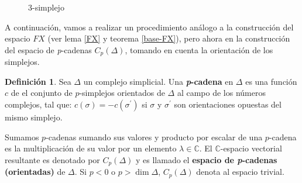 \documentclass[12pt]{book}
\theoremstyle{definition}
\newtheorem{definition}[theorem]{Definición}
\newcounter{in}
\newcounter{ini}
\begin{document}
\begin{figure}[h]
  \centering
  
  \caption{3-simplejo}
  \label{fig:3-simplejo}
\end{figure}
A continuación, vamos a realizar un procedimiento análogo a la construcción del
espacio $FX$ (ver lema \ref{FX} y teorema \ref{base-FX}), pero ahora en la
construcción del espacio de \emph{p}-cadenas $C_{p}(\Delta)$, tomando
en cuenta la orientación de los simplejos.
\begin{definition}
  Sea $\Delta$ un complejo simplicial. Una \textbf{\emph{p}-cadena} en
  $\Delta$ es una función $c$ de el conjunto de $p$-simplejos
  orientados de
  $\Delta$ al campo de los números complejos, tal que:
    $c(\sigma)=-c(\sigma^{'})$ si $\sigma$ y $\sigma^{'}$ son
      orientaciones opuestas del mismo simplejo.
\end{definition}


Sumamos $p$-cadenas sumando sus valores y producto por escalar de una
$p$-cadena es la multiplicación de su valor por un elemento $\lambda\in\mathbb{C}$. El $\mathbb{C}$-espacio vectorial resultante es
denotado por $C_{p}(\Delta)$ y es llamado el \textbf{espacio de
  \emph{p}-cadenas (orientadas)} de $\Delta$. Si $p<0$ o $p>\dim \Delta$,
$C_{p}(\Delta)$ denota al espacio trivial.
\end{document}
